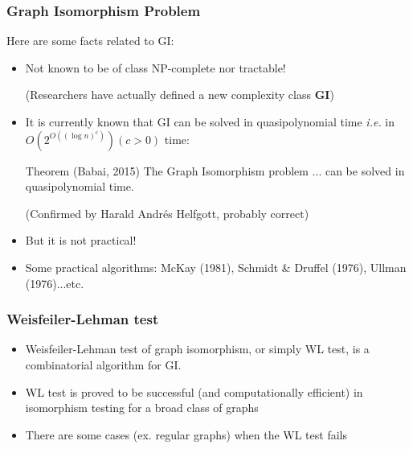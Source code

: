 \documentclass{beamer}
\begin{document}
\begin{frame}
\frametitle{Graph Isomorphism Problem}

Here are some facts related to \textsc{GI}:

\begin{itemize}
	\item Not known to be of class NP-complete nor tractable!
	
	(Researchers have actually defined a new complexity class {\bf GI}) \pause
	
	\item It is currently known that \textsc{GI} can be solved in quasipolynomial time {\it i.e.} in $O \left( 2^{O \left( \left( \log n \right)^c \right)} \right) (c > 0)$ time: \pause
	
\begin{block}{Theorem (Babai, 2015)}
The Graph Isomorphism problem ... can be solved in quasipolynomial time.
	\end{block}
(Confirmed by Harald Andr\'es Helfgott, probably correct)	
	 \pause

	\item But it is not practical! \pause
	
	\item Some practical algorithms: McKay (1981), Schmidt \& Druffel (1976), Ullman (1976)...etc.
\end{itemize}

\end{frame}

\begin{frame}
\frametitle{Weisfeiler-Lehman test}

\begin{itemize}
	\item Weisfeiler-Lehman test of graph isomorphism, or simply WL test, is a combinatorial algorithm for \textsc{GI}. \pause
	
	\item WL test is proved to be successful (and computationally efficient) in isomorphism testing for a broad class of graphs \pause
	
	\item There are some cases (ex. regular graphs) when the WL test fails
\end{itemize}

\end{frame}
\end{document}
